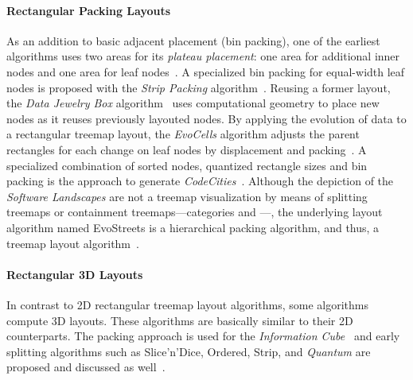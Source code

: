 \documentclass[sigconf%
,natbib=true%
]{acmart}
\begin{document}
\paragraph{\textbf{Rectangular Packing Layouts}}
As an addition to basic adjacent placement (bin packing), one of the earliest algorithms uses two areas for its \emph{plateau placement}: one area for additional inner nodes and one area for leaf nodes~\cite{andrews2002-informationpyramids}.
A specialized bin packing for equal-width leaf nodes is proposed with the \emph{Strip Packing} algorithm~\cite{kobayashi2012-edgeequalized}.
Reusing a former layout, the \emph{Data Jewelry Box} algorithm~\cite{yamaguchi2003-datajewelry} uses computational geometry to place new nodes as it reuses previously layouted nodes.
By applying the evolution of data to a rectangular treemap layout, the \emph{EvoCells} algorithm adjusts the parent rectangles for each change on leaf nodes by displacement and packing~\cite{scheibel2018-evocells}.
A specialized combination of sorted nodes, quantized rectangle sizes and bin packing is the approach to generate \emph{CodeCities}~\cite{wettel2007-comprehension}.
Although the depiction of the \emph{Software Landscapes} are not a treemap visualization by means of splitting treemaps or containment treemaps---categories \Ts{} and \Tc{}---, the underlying layout algorithm named EvoStreets is a hierarchical packing algorithm, and thus, a treemap layout algorithm~\cite{steinbruckner2010-developmenthistory}.

\paragraph{\textbf{Rectangular 3D Layouts}}
In contrast to 2D rectangular treemap layout algorithms, some algorithms compute 3D layouts.
These algorithms are basically similar to their 2D counterparts.
The packing approach is used for the \emph{Information Cube}~\cite{rekimoto1993-transparency} and early splitting algorithms such as Slice'n'Dice, Ordered, Strip, and \emph{Quantum} are proposed and discussed as well~\cite{tanaka2003-treecube}.
\end{document}
